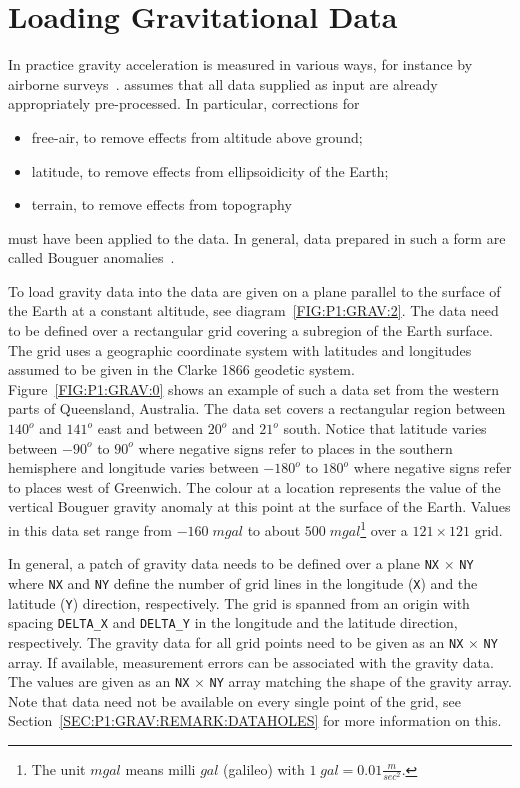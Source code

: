 \section{Loading Gravitational Data}\label{SEC:P1:GRAV:DATA}
In practice gravity acceleration is measured in various ways, for instance by
airborne surveys~\cite{Telford1990a}.
\downunder assumes that all data supplied as input are already appropriately
pre-processed. In particular, corrections for
\begin{itemize}
 \item free-air, to remove effects from altitude above ground;
 \item latitude, to remove effects from ellipsoidicity of the Earth;
 \item terrain, to remove effects from topography
\end{itemize}
must have been applied to the data.
In general, data prepared in such a form are called Bouguer anomalies~\cite{Telford1990a}.

To load gravity data into \downunder the data are given on a plane parallel
to the surface of the Earth at a constant altitude, see
diagram~\ref{FIG:P1:GRAV:2}.
The data need to be defined over a rectangular grid covering a subregion of
the Earth surface.
The grid uses a geographic coordinate system with latitudes and longitudes
assumed to be given in the Clarke 1866 geodetic system.
Figure~\ref{FIG:P1:GRAV:0} shows an example of such a data set from the
western parts of Queensland, Australia.
The data set covers a rectangular region between $140^o$ and $141^o$ east
and between $20^o$ and $21^o$ south.
Notice that latitude varies between $-90^o$ to $90^o$ where negative signs
refer to places in the southern hemisphere and longitude varies between
$-180^o$ to $180^o$ where negative signs refer to places west of Greenwich.
The colour at a location represents the value of the vertical Bouguer gravity
anomaly at this point at the surface of the Earth.
Values in this data set range from $-160 \; mgal$ to about $500 \; mgal$\footnote{The unit
$mgal$ means milli $gal$ (galileo) with $1 \; gal = 0.01 \frac{m}{sec^2}$.}
over a $121 \times 121$ grid.

In general, a patch of gravity data needs to be defined over a plane
\verb|NX| $\times$ \verb|NY| where \verb|NX| and \verb|NY| define the number
of grid lines in the longitude (\verb|X|) and the latitude (\verb|Y|)
direction, respectively.
The grid is spanned from an origin with spacing \verb|DELTA_X| and
\verb|DELTA_Y| in the longitude and the latitude direction, respectively.
The gravity data for all grid points need to be given as an \verb|NX|
$\times$ \verb|NY| array.
If available, measurement errors can be associated with the gravity data.
The values are given as an \verb|NX| $\times$ \verb|NY| array matching the
shape of the gravity array.
Note that data need not be available on every single point of the grid, see
Section~\ref{SEC:P1:GRAV:REMARK:DATAHOLES} for more information on this.

